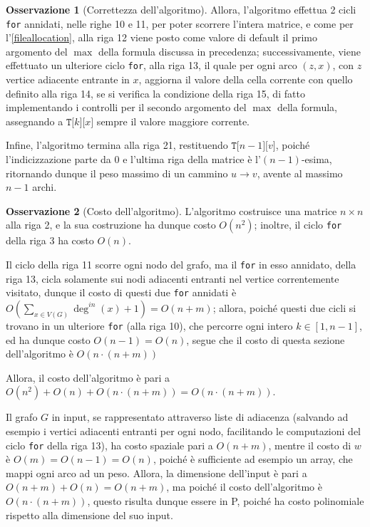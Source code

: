 \documentclass[14pt]{extreport}
\theoremstyle{definition}
\theoremstyle{definition}
\newtheorem{remark}{Osservazione}[subsection]
\begin{document}
\begin{remark}[Correttezza dell'algoritmo]
    Allora, l'algoritmo effettua 2 cicli \texttt{for} annidati, nelle righe 10 e 11, per poter scorrere l'intera matrice, e come per l'\cref{fileallocation}, alla riga 12 viene posto come valore di default il primo argomento del $\max$ della formula discussa in precedenza; successivamente, viene effettuato un ulteriore ciclo \texttt{for}, alla riga 13, il quale per ogni arco $(z, x)$, con $z$ vertice adiacente entrante in $x$, aggiorna il valore della cella corrente con quello definito alla riga 14, se si verifica la condizione della riga 15, di fatto implementando i controlli per il secondo argomento del $\max$ della formula, assegnando a $\texttt{T[}k\texttt{][}x\texttt{]}$ sempre il valore maggiore corrente.

    Infine, l'algoritmo termina alla riga 21, restituendo $\texttt{T[}n - 1\texttt{][}v\texttt{]}$, poiché l'indicizzazione parte da $0$ e l'ultima riga della matrice è l'$(n - 1)$-esima, ritornando dunque il peso massimo di un cammino $u \rightarrow v$, avente al massimo $n - 1$ archi.
\end{remark}

\begin{remark}[Costo dell'algoritmo]
    L'algoritmo costruisce una matrice $n \times n$ alla riga 2, e la sua costruzione ha dunque costo $O(n^2)$; inoltre, il ciclo \texttt{for} della riga 3 ha costo $O(n)$.

    Il ciclo della riga 11 scorre ogni nodo del grafo, ma il \texttt{for} in esso annidato, della riga 13, cicla solamente sui nodi adiacenti entranti nel vertice correntemente visitato, dunque il costo di questi due \texttt{for} annidati è $\displaystyle O\left(\sum_{x \in V(G)}{\deg^{in}(x) + 1} \right) = O(n + m)$; allora, poiché questi due cicli si trovano in un ulteriore \texttt{for} (alla riga 10), che percorre ogni intero $k \in [1, n- 1]$, ed ha dunque costo $O(n - 1) = O(n)$, segue che il costo di questa sezione dell'algoritmo è $O(n \cdot (n + m))$

    Allora, il costo dell'algoritmo è pari a $O(n ^2) + O(n) + O(n \cdot(n + m)) = O(n \cdot (n + m))$.

    Il grafo $G$ in input, se rappresentato attraverso liste di adiacenza (salvando ad esempio i vertici adiacenti entranti per ogni nodo, facilitando le computazioni del ciclo \texttt{for} della riga 13), ha costo spaziale pari a $O(n + m)$, mentre il costo di $w$ è $O(m) = O(n - 1) = O(n)$, poiché è sufficiente ad esempio un array, che mappi ogni arco ad un peso. Allora, la dimensione dell'input è pari a $O(n + m) + O(n) = O(n + m)$, ma poiché il costo dell'algoritmo è $O(n \cdot (n + m))$, questo risulta dunque essere in P, poiché ha costo polinomiale rispetto alla dimensione del suo input.
\end{remark}
\end{document}
